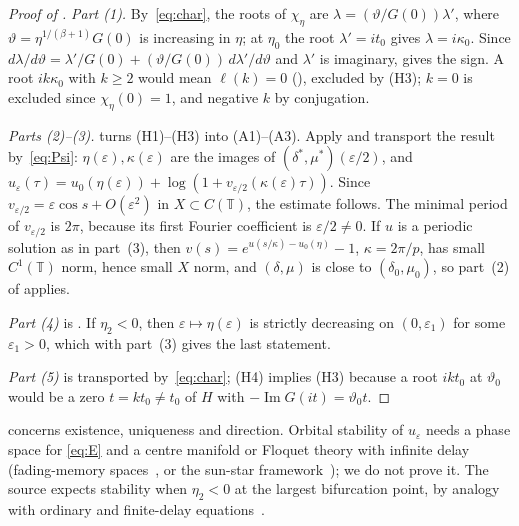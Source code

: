 \documentclass[11pt,a4paper]{report}
\providecommand{\T}{}
\renewcommand{\T}{\mathbb{T}}
\newcommand{\vth}{\vartheta}
\begin{document}
\begin{proof}[Proof of ]
\emph{Part (1).} By~\eqref{eq:char}, the roots of $\chi_\eta$ are $\lambda=(\vth/G(0))\lambda'$, where $\vth=\eta^{1/(\beta+1)}G(0)$ is increasing in $\eta$; at $\eta_0$ the root $\lambda'=it_0$ gives $\lambda=i\kappa_0$. Since $d\lambda/d\vth=\lambda'/G(0)+(\vth/G(0))\,d\lambda'/d\vth$ and $\lambda'$ is imaginary,  gives the sign. A root $ik\kappa_0$ with $k\ge2$ would mean $\ell(k)=0$ (), excluded by (H3); $k=0$ is excluded since $\chi_\eta(0)=1$, and negative $k$ by conjugation.

\emph{Parts (2)--(3).}  turns (H1)--(H3) into (A1)--(A3). Apply  and transport the result by~\eqref{eq:Psi}: $\eta(\varepsilon),\kappa(\varepsilon)$ are the images of $(\delta^*,\mu^*)(\varepsilon/2)$, and $u_\varepsilon(\tau)=u_0(\eta(\varepsilon))+\log(1+v_{\varepsilon/2}(\kappa(\varepsilon)\tau))$. Since $v_{\varepsilon/2}=\varepsilon\cos s+O(\varepsilon^2)$ in $X\subset C(\T)$, the estimate follows. The minimal period of $v_{\varepsilon/2}$ is $2\pi$, because its first Fourier coefficient is $\varepsilon/2\ne0$. If $u$ is a periodic solution as in part~(3), then $v(s)=e^{u(s/\kappa)-u_0(\eta)}-1$, $\kappa=2\pi/p$, has small $C^1(\T)$ norm, hence small $X$ norm, and $(\delta,\mu)$ is close to $(\delta_0,\mu_0)$, so part~(2) of  applies.

\emph{Part (4)} is . If $\eta_2<0$, then $\varepsilon\mapsto\eta(\varepsilon)$ is strictly decreasing on $(0,\varepsilon_1)$ for some $\varepsilon_1>0$, which with part~(3) gives the last statement.

\emph{Part (5)} is  transported by~\eqref{eq:char}; (H4) implies (H3) because a root $ikt_0$ at $\vth_0$ would be a zero $t=kt_0\ne t_0$ of $H$ with $-\operatorname{Im}G(it)=\vth_0t$.
\end{proof}

\begin{remark}
 concerns existence, uniqueness and direction. Orbital stability of $u_\varepsilon$ needs a phase space for \eqref{eq:E} and a centre manifold or Floquet theory with infinite delay (fading-memory spaces~\autocite{Staffans1987,HinoMurakamiNaito1991}, or the sun-star framework~\autocite{DiekmannGyllenberg2012}); we do not prove it. The source expects stability when $\eta_2<0$ at the largest bifurcation point, by analogy with ordinary and finite-delay equations~\autocite{DiekmannEtAl1995}.
\end{remark}
\end{document}

